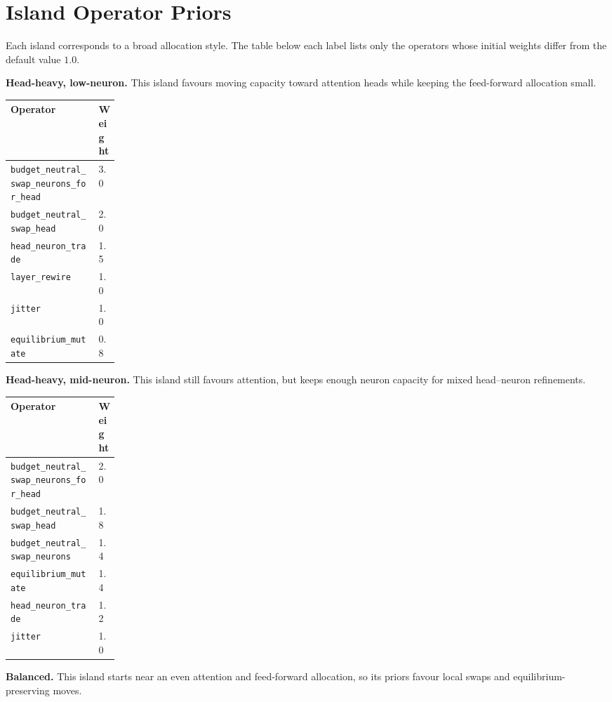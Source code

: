 \documentclass[10pt,twocolumn]{article}
\newcommand{\code}[1]{\texttt{\fontsize{8.1}{9.3}\selectfont #1}}
\newenvironment{hptable}{%
  \begin{tcolorbox}[tablebox]
  \footnotesize
  \renewcommand{\arraystretch}{1.12}
  \setlength{\tabcolsep}{3.0pt}
}{%
  \end{tcolorbox}
}
\begin{document}
\section{Island Operator Priors}
Each island corresponds to a broad allocation style. The table below each label lists only the operators whose initial weights differ from the default value $1.0$.

\textbf{Head-heavy, low-neuron.} This island favours moving capacity toward attention heads while keeping the feed-forward allocation small.

\begin{hptable}
\begin{tabularx}{\linewidth}{@{}Y M{0.18\linewidth}@{}}
\toprule
\textbf{Operator} & \textbf{Weight} \\
\midrule
\code{budget\_neutral\_swap\_neurons\_for\_head} & 3.0 \\
\code{budget\_neutral\_swap\_head} & 2.0 \\
\code{head\_neuron\_trade} & 1.5 \\
\code{layer\_rewire} & 1.0 \\
\code{jitter} & 1.0 \\
\code{equilibrium\_mutate} & 0.8 \\
\bottomrule
\end{tabularx}
\end{hptable}

\textbf{Head-heavy, mid-neuron.} This island still favours attention, but keeps enough neuron capacity for mixed head--neuron refinements.

\begin{hptable}
\begin{tabularx}{\linewidth}{@{}Y M{0.18\linewidth}@{}}
\toprule
\textbf{Operator} & \textbf{Weight} \\
\midrule
\code{budget\_neutral\_swap\_neurons\_for\_head} & 2.0 \\
\code{budget\_neutral\_swap\_head} & 1.8 \\
\code{budget\_neutral\_swap\_neurons} & 1.4 \\
\code{equilibrium\_mutate} & 1.4 \\
\code{head\_neuron\_trade} & 1.2 \\
\code{jitter} & 1.0 \\
\bottomrule
\end{tabularx}
\end{hptable}

\textbf{Balanced.} This island starts near an even attention and feed-forward allocation, so its priors favour local swaps and equilibrium-preserving moves.
\end{document}
